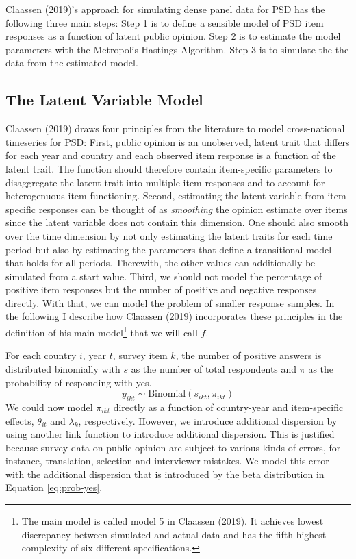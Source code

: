 \documentclass[12pt,english,a4paper,oneside]{article}
\theoremstyle{definition}
\theoremstyle{definition}
\theoremstyle{definition}
\theoremstyle{definition}
\theoremstyle{remark}
\begin{document}
Claassen (2019)'s approach for simulating dense panel data for PSD has the following three main steps: Step 1 is to define a sensible model of PSD item responses as a function of latent public opinion. Step 2 is to estimate the model parameters with the Metropolis Hastings Algorithm. Step 3 is to simulate the the data from the estimated model.

\hypertarget{the-latent-variable-model}{%
\subsection{The Latent Variable Model}\label{the-latent-variable-model}}

Claassen (2019) draws four principles from the literature to model cross-national timeseries for PSD: First, public opinion is an unobserved, latent trait that differs for each year and country and each observed item response is a function of the latent trait. The function should therefore contain item-specific parameters to disaggregate the latent trait into multiple item responses and to account for heterogenuous item functioning. Second, estimating the latent variable from item-specific responses can be thought of as \emph{smoothing} the opinion estimate over items since the latent variable does not contain this dimension. One should also smooth over the time dimension by not only estimating the latent traits for each time period but also by estimating the parameters that define a transitional model that holds for all periods. Therewith, the other values can additionally be simulated from a start value. Third, we should not model the percentage of positive item responses but the number of positive and negative responses directly. With that, we can model the problem of smaller response samples. In the following I describe how Claassen (2019) incorporates these principles in the definition of his main model\footnote{The main model is called model 5 in Claassen (2019). It achieves lowest discrepancy between simulated and actual data and has the fifth highest complexity of six different specifications.} that we will call \(f\).\newline

\noindent
For each country \(i\), year \(t\), survey item \(k\), the number of positive answers is distributed binomially with \(s\) as the number of total respondents and \(\pi\) as the probability of responding with yes.
\begin{equation}
\label{eq:num-resp}
y_{ikt} \sim \text{Binomial}(s_{ikt}, \pi_{ikt})
\end{equation}
We could now model \(\pi_{ikt}\) directly as a function of country-year and item-specific effects, \(\theta_{it}\) and \(\lambda_k\), respectively. However, we introduce additional dispersion by using another link function to introduce additional dispersion. This is justified because survey data on public opinion are subject to various kinds of errors, for instance, translation, selection and interviewer mistakes. We model this error with the additional dispersion that is introduced by the beta distribution in Equation \eqref{eq:prob-yes}.
\end{document}

